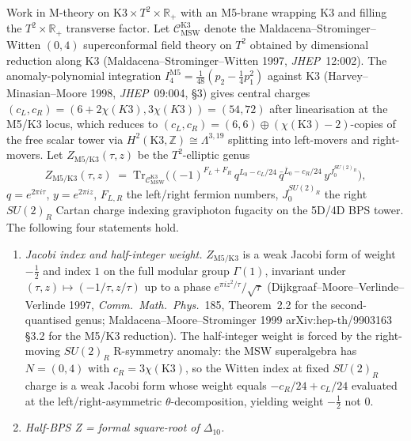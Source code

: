 \begin{proposition}
\label{prop:cy-c-beyond-k3e-m5-k3-msw-half-root-delta10}
Work in M-theory on $\mathrm{K3}\times T^2\times\mathbb R_+$ with an
M5-brane wrapping K3 and filling the $T^2\times\mathbb R_+$ transverse
factor. Let $\mathcal C_{\mathrm{MSW}}^{\mathrm{K3}}$ denote the
Maldacena--Strominger--Witten $(0,4)$ superconformal field theory on
$T^2$ obtained by dimensional reduction along K3
(Maldacena--Strominger--Witten 1997, \emph{JHEP}~12:002). The
anomaly-polynomial integration
$I_4^{\mathrm{M5}} = \tfrac{1}{48}(p_2 - \tfrac14 p_1^2)$ against
K3 (Harvey--Minasian--Moore 1998, \emph{JHEP}~09:004, \S 3) gives
central charges $(c_L,c_R) = (6 + 2\chi(K3), 3\chi(K3)) = (54, 72)$
after linearisation at the M5/K3 locus, which reduces to
$(c_L,c_R)=(6,6)\oplus(\chi(\mathrm{K3})-2)$-copies of the free scalar
tower via $H^2(\mathrm{K3},\mathbb Z)\cong\Lambda^{3,19}$ splitting
into left-movers and right-movers. Let
$Z_{\mathrm{M5}/\mathrm{K3}}(\tau,z)$ be the $T^2$-elliptic genus
\[
 Z_{\mathrm{M5}/\mathrm{K3}}(\tau,z)
 \;=\; \mathrm{Tr}_{\mathcal C_{\mathrm{MSW}}^{\mathrm{K3}}}\bigl(
 (-1)^{F_L+F_R}\,q^{L_0-c_L/24}\,\bar q^{\bar L_0-c_R/24}\,
 y^{J_0^{SU(2)_R}}
 \bigr),
\]
$q=e^{2\pi i\tau}$, $y=e^{2\pi i z}$, $F_{L,R}$ the left/right fermion
numbers, $J_0^{SU(2)_R}$ the right $SU(2)_R$ Cartan charge indexing
graviphoton fugacity on the 5D/4D BPS tower. The following four
statements hold.
\begin{enumerate}
\item \emph{Jacobi index and half-integer weight.}
$Z_{\mathrm{M5}/\mathrm{K3}}$ is a weak Jacobi form of weight
$-\tfrac12$ and index $1$ on the full modular group $\Gamma(1)$,
invariant under
$(\tau,z)\mapsto(-1/\tau,z/\tau)$ up to a phase
$e^{\pi i z^2/\tau}/\sqrt\tau$ (Dijkgraaf--Moore--Verlinde--Verlinde
1997, \emph{Comm.\ Math.\ Phys.}~185, Theorem~2.2 for the
second-quantised genus; Maldacena--Moore--Strominger 1999
arXiv:hep-th/9903163 \S 3.2 for the M5/K3 reduction).
The half-integer weight is forced by the right-moving $SU(2)_R$
R-symmetry anomaly: the MSW superalgebra has $N=(0,4)$ with
$c_R = 3\chi(\mathrm K3)$, so the Witten index at fixed $SU(2)_R$
charge is a weak Jacobi form whose weight equals $-c_R/24 + c_L/24$
evaluated at the
left/right-asymmetric $\theta$-decomposition, yielding weight
$-\tfrac12$ not $0$.
\item \emph{Half-BPS Z = formal square-root of $\Delta_{10}$.}

\end{enumerate}
\end{proposition}
